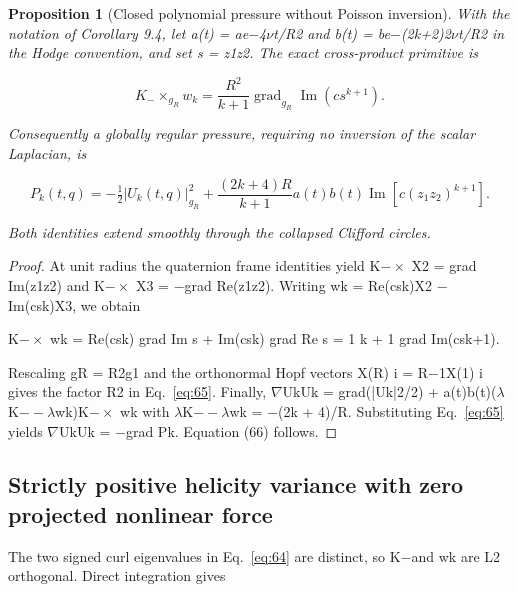 \documentclass[10pt,letterpaper]{article}
\newtheorem{proposition}[theorem]{Proposition}
\theoremstyle{remark}
\begin{document}
\begin{proposition}[Closed polynomial pressure without Poisson inversion]

With the notation of Corollary 9.4, let a(t) = ae\(- \)4\(\nu \)t/R2 and b(t) = be\(- \)(2k+2)2\(\nu \)t/R2 in the Hodge convention, and set s = z1z2. The exact cross-product primitive is


\begin{equation}
\tag{65}\label{eq:65}
K_-\times_{g_R}w_k=\frac{R^2}{k+1}\operatorname{grad}_{g_R}\operatorname{Im}(cs^{k+1}).
\end{equation}

Consequently a globally regular pressure, requiring no inversion of the scalar Laplacian, is



\begin{equation}
\tag{66}\label{eq:66}
P_k(t,q)=-\tfrac12|U_k(t,q)|_{g_R}^2+\frac{(2k+4)R}{k+1}a(t)b(t)\operatorname{Im}[c(z_1z_2)^{k+1}].
\end{equation}

Both identities extend smoothly through the collapsed Clifford circles.


\end{proposition}

\begin{proof}
At unit radius the quaternion frame identities yield K\(- \times \) X2 = grad Im(z1z2) and K\(- \times \) X3 = \(- \)grad Re(z1z2). Writing wk = Re(csk)X2 \(- \)Im(csk)X3, we obtain

K\(- \times \) wk = Re(csk) grad Im s + Im(csk) grad Re s = 1 k + 1 grad Im(csk+1).


Rescaling gR = R2g1 and the orthonormal Hopf vectors X(R) i = R\(- \)1X(1) i gives the factor R2 in Eq.~\eqref{eq:65}. Finally, \(\nabla \)UkUk = grad(|Uk|2/2) + a(t)b(t)(\(\lambda \)K\(- - \lambda \)wk)K\(- \times \) wk with \(\lambda \)K\(- - \lambda \)wk = \(- \)(2k + 4)/R. Substituting Eq.~\eqref{eq:65} yields \(\nabla \)UkUk = \(- \)grad Pk. Equation (66) follows.


\end{proof}

\subsection{Strictly positive helicity variance with zero projected nonlinear force}

The two signed curl eigenvalues in Eq.~\eqref{eq:64} are distinct, so K\(- \)and wk are L2 orthogonal. Direct integration gives
\end{document}
